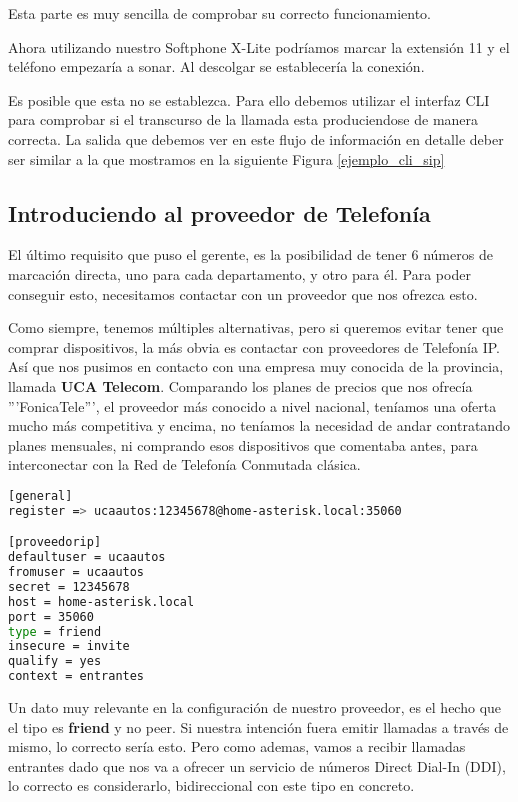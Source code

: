Esta parte es muy sencilla de comprobar su correcto funcionamiento.

Ahora utilizando nuestro Softphone X-Lite podríamos marcar la extensión 11 y el teléfono empezaría a sonar. Al descolgar se establecería la conexión.

Es posible que esta no se establezca. Para ello debemos utilizar el interfaz CLI para comprobar si el transcurso de la llamada esta produciendose de manera correcta. La salida que debemos ver en este flujo de información en detalle deber ser similar a la que mostramos en la siguiente Figura \ref{ejemplo_cli_sip}



\newpage

\subsection{Introduciendo al proveedor de Telefonía}

El último requisito que puso el gerente, es la posibilidad de tener 6 números de marcación directa, uno para cada departamento, y otro para él. Para poder conseguir esto, necesitamos contactar con un proveedor que nos ofrezca esto.

Como siempre, tenemos múltiples alternativas, pero si queremos evitar tener que comprar dispositivos, la más obvia es contactar con proveedores de Telefonía IP. Así que nos pusimos en contacto con una empresa muy conocida de la provincia, llamada \textbf{UCA Telecom}. Comparando los planes de precios que nos ofrecía '''FonicaTele''', el proveedor más conocido a nivel nacional, teníamos una oferta mucho más competitiva y encima, no teníamos la necesidad de andar contratando planes mensuales, ni comprando esos dispositivos que comentaba antes, para interconectar con la Red de Telefonía Conmutada clásica.

\begin{lstlisting}[language=bash,title={/etc/asterisk/sip.conf}]
[general]
register => ucaautos:12345678@home-asterisk.local:35060

[proveedorip]
defaultuser = ucaautos
fromuser = ucaautos
secret = 12345678
host = home-asterisk.local
port = 35060
type = friend
insecure = invite
qualify = yes
context = entrantes
\end{lstlisting}

Un dato muy relevante en la configuración de nuestro proveedor, es el hecho que el tipo es \textbf{friend} y no peer. Si nuestra intención fuera emitir llamadas a través de mismo, lo correcto sería esto. Pero como ademas, vamos a recibir llamadas entrantes dado que nos va a ofrecer un servicio de números Direct Dial-In (DDI), lo correcto es considerarlo, bidireccional con este tipo en concreto.

